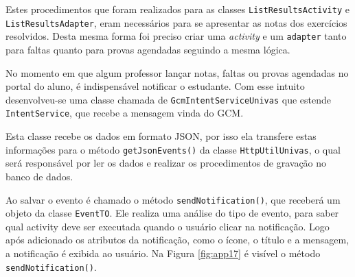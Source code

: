 	\par Estes procedimentos que foram realizados para as classes
\texttt{ListResultsActivity} e \texttt{ListResultsAdapter}, eram necessários
para se apresentar as notas dos exercícios resolvidos. Desta mesma forma foi
preciso criar uma \textit{activity} e um \texttt{adapter} tanto para faltas
quanto para provas agendadas seguindo a mesma lógica.

	\par No momento em que algum professor lançar notas, faltas ou provas agendadas
no portal do aluno, é indispensável notificar o estudante. Com esse intuito
desenvolveu-se uma classe chamada de \texttt{GcmIntentServiceUnivas} que
estende \texttt{IntentService}, que recebe a mensagem vinda do GCM.

	\par Esta classe recebe os dados em formato JSON, por isso ela transfere estas
informações para o método \texttt{getJsonEvents()} da classe
\texttt{HttpUtilUnivas}, o qual será responsável por ler os dados e realizar os
procedimentos de gravação no banco de dados.

	\par Ao salvar o evento é chamado o método \texttt{sendNotification()}, que
receberá um objeto da classe \texttt{EventTO}. Ele realiza uma análise do tipo
de evento, para saber qual activity deve ser executada quando o usuário clicar
na notificação. Logo após adicionado os atributos da notificação, como o ícone,
o título e a mensagem, a notificação é exibida ao usuário. Na Figura
\ref{fig:app17} é visível o método \texttt{sendNotification()}.

